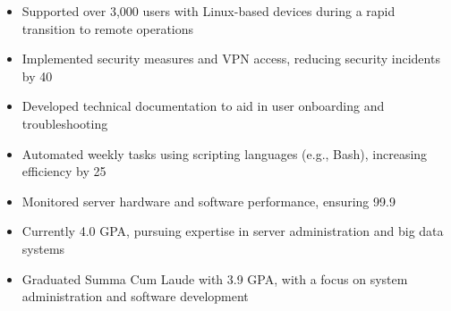 \par\smallskip
\noindent
\begin{minipage}{20cm}
  \begin{minipage}{9.75cm}
    \begin{itemize}
      \item Supported over 3,000 users with Linux-based devices during a rapid transition to remote operations
      \item Implemented security measures and VPN access, reducing security incidents by 40%
      \item Developed technical documentation to aid in user onboarding and troubleshooting
    \end{itemize}
  \end{minipage}
  \hfill
  \begin{minipage}{9.75cm}
    \begin{itemize}
      \item Automated weekly tasks using scripting languages (e.g., Bash), increasing efficiency by 25%
      \item Monitored server hardware and software performance, ensuring 99.9%
    \end{itemize}
  \end{minipage}
\end{minipage}

\begin{itemize}
  \item Currently 4.0 GPA, pursuing expertise in server administration and big data systems
\end{itemize}
\divider

\begin{itemize}
  \item Graduated Summa Cum Laude with 3.9 GPA, with a focus on system administration and software development
\end{itemize}

\noindent
\begin{minipage}{20cm}
\end{minipage}


